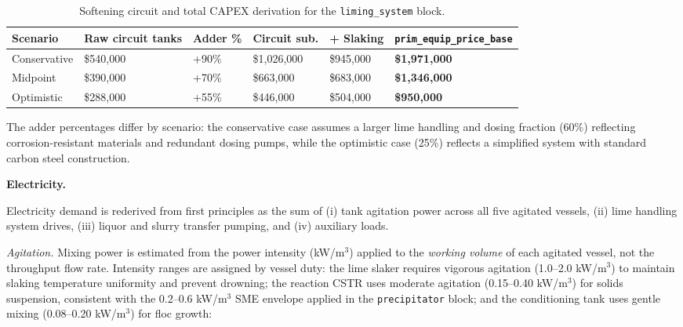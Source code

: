\begin{table}[h!]
\caption{Softening circuit and total CAPEX derivation for the \texttt{liming\_system} block.}
\centering
\begin{tabular}{>{\raggedright\arraybackslash}p{2.3cm}
				>{\raggedright\arraybackslash}p{2.3cm}
				>{\raggedright\arraybackslash}p{2.2cm}
				>{\raggedright\arraybackslash}p{2.0cm}
				>{\raggedright\arraybackslash}p{2.0cm}
				>{\raggedright\arraybackslash}p{2.8cm}}
\toprule
\textbf{Scenario} & \textbf{Raw circuit tanks} & \textbf{Adder \%} & \textbf{Circuit sub.} & \textbf{+ Slaking} & \texttt{prim\_equip\_price\_base} \\
\midrule
Conservative & \$540,000 & +90\% & \$1,026,000 & \$945,000 & \textbf{\$1,971,000} \\
Midpoint     & \$390,000 & +70\% & \$663,000  & \$683,000 & \textbf{\$1,346,000} \\
Optimistic   & \$288,000 & +55\% & \$446,000  & \$504,000 & \textbf{\$950,000} \\
\bottomrule
\end{tabular}
\end{table}

\noindent The adder percentages differ by scenario: the conservative case assumes a larger lime handling and dosing fraction (60\%) reflecting corrosion-resistant materials and redundant dosing pumps, while the optimistic case (25\%) reflects a simplified system with standard carbon steel construction.

\medskip
\noindent\textbf{Electricity.}\quad

Electricity demand is rederived from first principles as the sum of (i) tank agitation power across all five agitated vessels, (ii) lime handling system drives, (iii) liquor and slurry transfer pumping, and (iv) auxiliary loads.

\textit{Agitation.} Mixing power is estimated from the power intensity (kW/m$^3$) applied to the \textit{working volume} of each agitated vessel, not the throughput flow rate. Intensity ranges are assigned by vessel duty: the lime slaker requires vigorous agitation (1.0--2.0 kW/m$^3$) to maintain slaking temperature uniformity and prevent drowning; the reaction CSTR uses moderate agitation (0.15--0.40 kW/m$^3$) for solids suspension, consistent with the 0.2--0.6 kW/m$^3$ SME envelope applied in the \texttt{precipitator} block; and the conditioning tank uses gentle mixing (0.08--0.20 kW/m$^3$) for floc growth:

